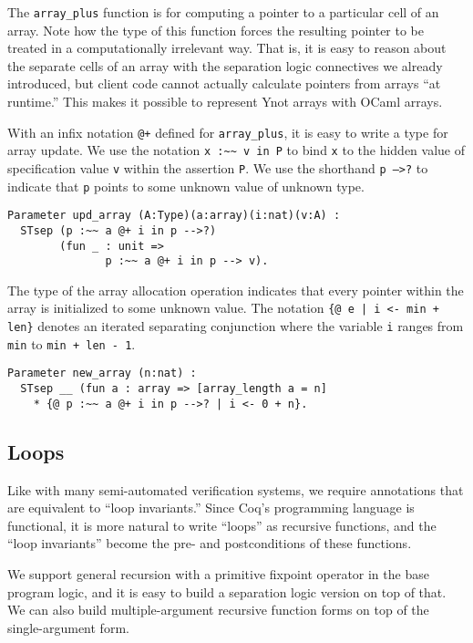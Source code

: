 \documentclass[preprint,nocopyrightspace]{sigplanconf}
\newcommand{\cd}[1]{\texttt{#1}}
\begin{document}
The \cd{array\_plus} function is for computing a pointer to a particular cell of an array.  Note how the type of this function forces the resulting pointer to be treated in a computationally irrelevant way.  That is, it is easy to reason about the separate cells of an array with the separation logic connectives we already introduced, but client code cannot actually calculate pointers from arrays ``at runtime.''  This makes it possible to represent Ynot arrays with OCaml arrays.

With an infix notation \cd{@+} defined for \cd{array\_plus}, it is easy to write a type for array update.  We use the notation \cd{x :\textasciitilde\textasciitilde \; v in P} to bind \cd{x} to the hidden value of specification value \cd{v} within the assertion \cd{P}.  We use the shorthand \cd{p -->?} to indicate that \cd{p} points to some unknown value of unknown type.

\begin{verbatim}
Parameter upd_array (A:Type)(a:array)(i:nat)(v:A) :
  STsep (p :~~ a @+ i in p -->?)
        (fun _ : unit =>
               p :~~ a @+ i in p --> v).
\end{verbatim}

The type of the array allocation operation indicates that every pointer within the array is initialized to some unknown value.  The notation \cd{\{@ e | i <- min + len\}} denotes an iterated separating conjunction where the variable \cd{i} ranges from \cd{min} to \cd{min + len - 1}.

\begin{verbatim}
Parameter new_array (n:nat) :
  STsep __ (fun a : array => [array_length a = n]
    * {@ p :~~ a @+ i in p -->? | i <- 0 + n}.
\end{verbatim}


\subsection{Loops}

Like with many semi-automated verification systems, we require annotations that are equivalent to ``loop invariants.''  Since Coq's programming language is functional, it is more natural to write ``loops'' as recursive functions, and the ``loop invariants'' become the pre- and postconditions of these functions.

We support general recursion with a primitive fixpoint operator in the base program logic, and it is easy to build a separation logic version on top of that.  We can also build multiple-argument recursive function forms on top of the single-argument form.
\end{document}
